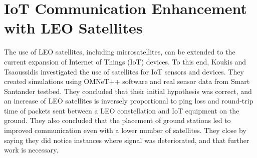 \section{IoT Communication Enhancement with LEO Satellites}
The use of LEO satellites, including microsatellites, can be extended to the current expansion of Internet of Things (IoT) devices. 
To this end, Koukis and Tsaoussidis investigated the use of satellites for IoT sensors and devices. 
They created simulations using OMNeT++ software and real sensor data from Smart Santander testbed. 
They concluded that their initial hypothesis was correct, and an increase of LEO satellites is inversely proportional to ping loss and round-trip time of packets sent between a LEO constellation and IoT equipment on the ground. 
They also concluded that the placement of ground stations led to improved communication even with a lower number of satellites. 
They close by saying they did notice instances where signal was deteriorated, and that further work is necessary\cite{RefWorks:koukis2023satellite-assisted}.